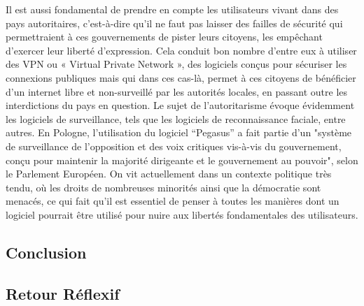 \documentclass{article}
\begin{document}
Il est aussi fondamental de prendre en compte les utilisateurs vivant dans des pays autoritaires, c’est-à-dire qu’il ne faut pas laisser des failles de sécurité qui permettraient à ces gouvernements de pister leurs citoyens, les empêchant d’exercer leur liberté d’expression. Cela conduit bon nombre d’entre eux à utiliser des VPN ou « Virtual Private Network », des logiciels conçus pour sécuriser les connexions publiques mais qui dans ces cas-là, permet à ces citoyens de bénéficier d’un internet libre et non-surveillé par les autorités locales, en passant outre les interdictions du pays en question. Le sujet de l’autoritarisme évoque évidemment les logiciels de surveillance, tels que les logiciels de reconnaissance faciale, entre autres. En Pologne, l’utilisation du logiciel “Pegasus” a fait partie d’un "système de surveillance de l'opposition et des voix critiques vis-à-vis du gouvernement, conçu pour maintenir la majorité dirigeante et le gouvernement au pouvoir", selon le Parlement Européen. On vit actuellement dans un contexte politique très tendu, où les droits de nombreuses minorités ainsi que la démocratie sont menacés, ce qui fait qu’il est essentiel de penser à toutes les manières dont un logiciel pourrait être utilisé pour nuire aux libertés fondamentales des utilisateurs.\\

\subsection{Conclusion}

\subsection{Retour Réflexif}





\end{document}
